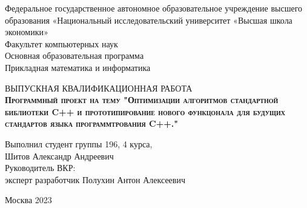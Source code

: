\begin{titlepage}
\newpage

{
\begin{center}
Федеральное государственное автономное образовательное учреждение высшего образования «Национальный исследовательский университет «Высшая школа экономики»
\\
\bigskip
Факультет компьютерных наук \\
Основная образовательная программа \\
Прикладная математика и информатика \\
\end{center}
}

\vspace{8em}

\begin{center}
{\Large ВЫПУСКНАЯ КВАЛИФИКАЦИОННАЯ РАБОТА}\\
\textsc{\textbf{
Программный проект на тему
\linebreak
"Оптимизации алгоритмов стандартной библиотеки C++ и прототипирование нового функцонала для будущих стандартов языка программтрования C++."}}
\end{center}

\vspace{8em}

{
\hfill\parbox{16cm}{
\hspace*{5cm}\hspace*{-5cm}Выполнил студент группы 196, 4 курса,\\
Шитов Александр Андреевич\\
 
\hspace*{5cm}\hspace*{-5cm}Руководитель ВКР:\\
эксперт разработчик Полухин Антон Алексеевич\\


}
}

\vspace{\fill}

\begin{center}
Москва 2023
\end{center}

\end{titlepage}